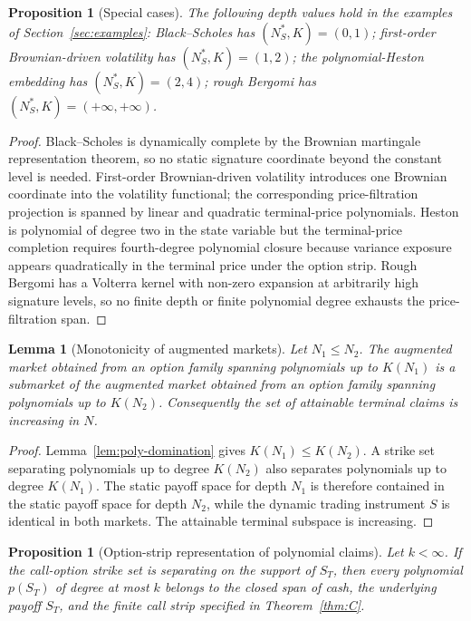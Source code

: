 \documentclass[11pt,oneside]{article}
\theoremstyle{plain}
\newtheorem{proposition}[theorem]{Proposition}
\newtheorem{lemma}[theorem]{Lemma}
\theoremstyle{definition}
\theoremstyle{remark}
\begin{document}
\begin{proposition}[Special cases]\label{prop:depth-special}
The following depth values hold in the examples of Section~\ref{sec:examples}: Black--Scholes has $(N_S^\ast,K)=(0,1)$; first-order Brownian-driven volatility has $(N_S^\ast,K)=(1,2)$; the polynomial-Heston embedding has $(N_S^\ast,K)=(2,4)$; rough Bergomi has $(N_S^\ast,K)=(+\infty,+\infty)$.
\end{proposition}

\begin{proof}
Black--Scholes is dynamically complete by the Brownian martingale representation theorem, so no static signature coordinate beyond the constant level is needed. First-order Brownian-driven volatility introduces one Brownian coordinate into the volatility functional; the corresponding price-filtration projection is spanned by linear and quadratic terminal-price polynomials. Heston is polynomial of degree two in the state variable but the terminal-price completion requires fourth-degree polynomial closure because variance exposure appears quadratically in the terminal price under the option strip. Rough Bergomi has a Volterra kernel with non-zero expansion at arbitrarily high signature levels, so no finite depth or finite polynomial degree exhausts the price-filtration span.
\end{proof}



\begin{lemma}[Monotonicity of augmented markets]\label{lem:market-monotone}
Let $N_1\leq N_2$. The augmented market obtained from an option family spanning polynomials up to $K(N_1)$ is a submarket of the augmented market obtained from an option family spanning polynomials up to $K(N_2)$. Consequently the set of attainable terminal claims is increasing in $N$.
\end{lemma}

\begin{proof}
Lemma~\ref{lem:poly-domination} gives $K(N_1)\leq K(N_2)$. A strike set separating polynomials up to degree $K(N_2)$ also separates polynomials up to degree $K(N_1)$. The static payoff space for depth $N_1$ is therefore contained in the static payoff space for depth $N_2$, while the dynamic trading instrument $S$ is identical in both markets. The attainable terminal subspace is increasing.
\end{proof}

\begin{proposition}[Option-strip representation of polynomial claims]\label{prop:option-strip}
Let $k<\infty$. If the call-option strike set is separating on the support of $S_T$, then every polynomial $p(S_T)$ of degree at most $k$ belongs to the closed span of cash, the underlying payoff $S_T$, and the finite call strip specified in Theorem~\ref{thm:C}.
\end{proposition}
\end{document}
